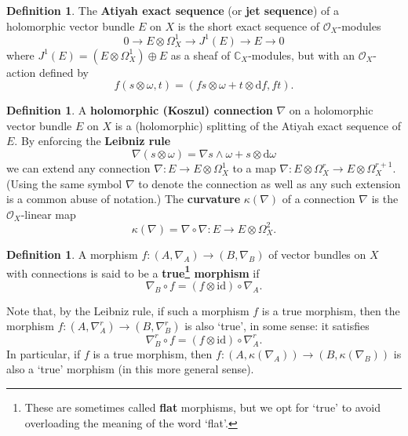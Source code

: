 \documentclass[11pt,fleqn]{article}
\theoremstyle{plain}
\theoremstyle{definition}
\newtheorem{definition}[theorem]{Definition}
\theoremstyle{remark}
\numberwithin{equation}{theorem}
\newcommand{\OO}{\mathcal{O}}
\newcommand{\id}{\mathrm{id}}
\newcommand{\define}[1]{\textbf{#1}}
\renewcommand{\d}{\mathrm{d}}
\begin{document}
        \begin{definition}
            The \define{Atiyah exact sequence} (or \define{jet sequence}) of a holomorphic vector bundle $E$ on $X$ is the short exact sequence of $\OO_X$-modules
            \[
                0
                \to
                E\otimes\Omega_X^1
                \to
                J^1(E)
                \to
                E
                \to
                0
            \]
            where $J^1(E)=(E\otimes\Omega_X^1)\oplus E$ as a sheaf of $\mathbb{C}_X$-modules, but with an $\OO_X$-action defined by
            \[
                f(s\otimes\omega,t)
                =
                (fs\otimes\omega + t\otimes\d f, ft).
            \]
        \end{definition}

        \begin{definition}
            A \define{holomorphic (Koszul) connection} $\nabla$ on a holomorphic vector bundle $E$ on $X$ is a (holomorphic) splitting of the Atiyah exact sequence of $E$.
            By enforcing the \define{Leibniz rule}
            \[
                \nabla(s\otimes\omega)
                =
                \nabla s\wedge\omega + s\otimes\d\omega
            \]
            we can extend any connection $\nabla\colon E\to E\otimes\Omega_X^1$ to a map $\nabla\colon E\otimes\Omega_X^r\to E\otimes\Omega_X^{r+1}$.
            (Using the same symbol $\nabla$ to denote the connection as well as any such extension is a common abuse of notation.)
            The \define{curvature} $\kappa(\nabla)$ of a connection $\nabla$ is the $\OO_X$-linear map
            \[
                \kappa(\nabla)=\nabla\circ\nabla\colon
                E\to E\otimes\Omega_X^2.
            \]
        \end{definition}

        \begin{definition}\label{definition:true-morphism}
            A morphism $f\colon(A,\nabla_A)\to(B,\nabla_B)$ of vector bundles on $X$ with connections is said to be a \define{true\footnote{These are sometimes called \define{flat} morphisms, but we opt for `true' to avoid overloading the meaning of the word `flat'.} morphism} if
            \[
                \nabla_B\circ f = (f\otimes\id)\circ\nabla_A.
            \]

            Note that, by the Leibniz rule, if such a morphism $f$ is a true morphism, then the morphism $f\colon(A,\nabla_A^r)\to(B,\nabla_B^r)$ is also `true', in some sense: it satisfies
            \[
                \nabla_B^r \circ f = (f\otimes\id) \circ \nabla_A^r.
            \]
            In particular, if $f$ is a true morphism, then $f\colon(A,\kappa(\nabla_A))\to(B,\kappa(\nabla_B))$ is also a `true' morphism (in this more general sense).
        \end{definition}
\end{document}
